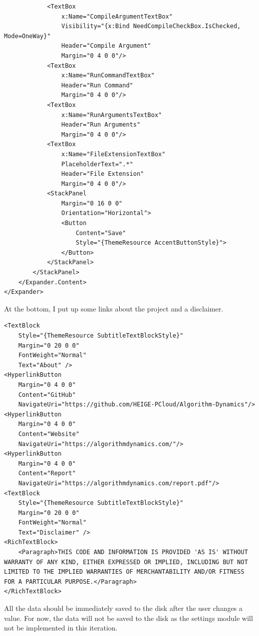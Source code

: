 \documentclass[a4paper]{report}
\begin{document}
\begin{verbatim}
            <TextBox
                x:Name="CompileArgumentTextBox"
                Visibility="{x:Bind NeedCompileCheckBox.IsChecked, Mode=OneWay}"
                Header="Compile Argument"
                Margin="0 4 0 0"/>
            <TextBox
                x:Name="RunCommandTextBox"
                Header="Run Command"
                Margin="0 4 0 0"/>
            <TextBox
                x:Name="RunArgumentsTextBox"
                Header="Run Arguments"
                Margin="0 4 0 0"/>
            <TextBox
                x:Name="FileExtensionTextBox"
                PlaceholderText=".*"
                Header="File Extension"
                Margin="0 4 0 0"/>
            <StackPanel 
                Margin="0 16 0 0"
                Orientation="Horizontal">
                <Button
                    Content="Save"
                    Style="{ThemeResource AccentButtonStyle}">
                </Button>
            </StackPanel>
        </StackPanel>
    </Expander.Content>
</Expander>
\end{verbatim}

At the bottom, I put up some links about the project and a disclaimer.

\begin{verbatim}
<TextBlock
    Style="{ThemeResource SubtitleTextBlockStyle}"
    Margin="0 20 0 0"
    FontWeight="Normal"
    Text="About" />
<HyperlinkButton 
    Margin="0 4 0 0"
    Content="GitHub"
    NavigateUri="https://github.com/HEIGE-PCloud/Algorithm-Dynamics"/>
<HyperlinkButton 
    Margin="0 4 0 0"
    Content="Website"
    NavigateUri="https://algorithmdynamics.com/"/>
<HyperlinkButton 
    Margin="0 4 0 0"
    Content="Report"
    NavigateUri="https://algorithmdynamics.com/report.pdf"/>
<TextBlock
    Style="{ThemeResource SubtitleTextBlockStyle}"
    Margin="0 20 0 0"
    FontWeight="Normal"
    Text="Disclaimer" />
<RichTextBlock>
    <Paragraph>THIS CODE AND INFORMATION IS PROVIDED 'AS IS' WITHOUT WARRANTY OF ANY KIND, EITHER EXPRESSED OR IMPLIED, INCLUDING BUT NOT LIMITED TO THE IMPLIED WARRANTIES OF MERCHANTABILITY AND/OR FITNESS FOR A PARTICULAR PURPOSE.</Paragraph>
</RichTextBlock>
\end{verbatim}

All the data should be immediately saved to the disk after the user changes a value. For now, the data will not be saved to the disk as the settings module will not be implemented in this iteration.
\end{document}
